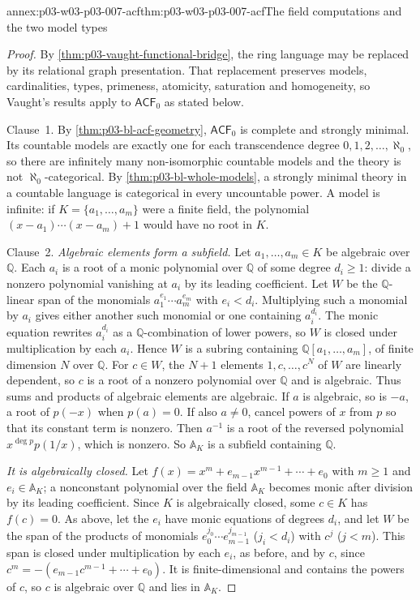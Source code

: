 \begin{annexitem}{annex:p03-w03-p03-007-acf}{thm:p03-w03-p03-007-acf}{The field computations and the two model types}
\begin{proof}
By \cref{thm:p03-vaught-functional-bridge}, the ring language may be
replaced by its relational graph presentation. That replacement preserves
models, cardinalities, types, primeness, atomicity, saturation and
homogeneity, so Vaught's results apply to \(\mathsf{ACF}_0\) as stated below.

Clause~1. By \cref{thm:p03-bl-acf-geometry}, \(\mathsf{ACF}_0\) is complete
and strongly minimal. Its countable models are exactly one for each
transcendence degree \(0,1,2,\ldots,\aleph_0\), so there are infinitely many
non-isomorphic countable models and the theory is not
\(\aleph_0\)-categorical. By \cref{thm:p03-bl-whole-models}, a strongly
minimal theory in a countable language is categorical in every uncountable
power. A model is infinite: if \(K=\{a_1,\ldots,a_m\}\) were a finite field,
the polynomial \((x-a_1)\cdots(x-a_m)+1\) would have no root in \(K\).

Clause~2. \emph{Algebraic elements form a subfield.} Let
\(a_1,\ldots,a_m\in K\) be algebraic over \(\mathbb Q\). Each \(a_i\) is a root
of a monic polynomial over \(\mathbb Q\) of some degree \(d_i\ge1\): divide a
nonzero polynomial vanishing at \(a_i\) by its leading coefficient. Let
\(W\) be the \(\mathbb Q\)-linear span of the monomials
\(a_1^{e_1}\cdots a_m^{e_m}\) with \(e_i<d_i\). Multiplying such a monomial by
\(a_i\) gives either another such monomial or one containing
\(a_i^{d_i}\). The monic equation rewrites \(a_i^{d_i}\) as a
\(\mathbb Q\)-combination of lower powers, so \(W\) is closed under
multiplication by each \(a_i\). Hence \(W\) is a subring containing
\(\mathbb Q[a_1,\ldots,a_m]\), of finite dimension \(N\) over \(\mathbb Q\).
For \(c\in W\), the \(N+1\) elements \(1,c,\ldots,c^N\) of \(W\) are linearly
dependent, so \(c\) is a root of a nonzero polynomial over \(\mathbb Q\) and is
algebraic. Thus sums and products of algebraic elements are algebraic. If
\(a\) is algebraic, so is \(-a\), a root of \(p(-x)\) when \(p(a)=0\). If
also \(a\neq0\), cancel powers of \(x\) from \(p\) so that its constant term
is nonzero. Then \(a^{-1}\) is a root of the reversed polynomial
\(x^{\deg p}p(1/x)\), which is nonzero. So \(\mathbb A_K\) is a subfield
containing \(\mathbb Q\).

\emph{It is algebraically closed.} Let
\(f(x)=x^m+e_{m-1}x^{m-1}+\cdots+e_0\) with \(m\ge1\) and
\(e_i\in\mathbb A_K\); a nonconstant polynomial over the field \(\mathbb A_K\)
becomes monic after division by its leading coefficient. Since \(K\) is
algebraically closed, some \(c\in K\) has \(f(c)=0\). As above, let the
\(e_i\) have monic equations of degrees \(d_i\), and let \(W\) be the span of
the products of monomials \(e_0^{j_0}\cdots e_{m-1}^{j_{m-1}}\) (\(j_i<d_i\))
with \(c^j\) (\(j<m\)). This span is closed under multiplication by each
\(e_i\), as before, and by \(c\), since
\(c^m=-(e_{m-1}c^{m-1}+\cdots+e_0)\). It is finite-dimensional and contains
the powers of \(c\), so \(c\) is algebraic over \(\mathbb Q\) and lies in
\(\mathbb A_K\).


\end{proof}
\end{annexitem}
